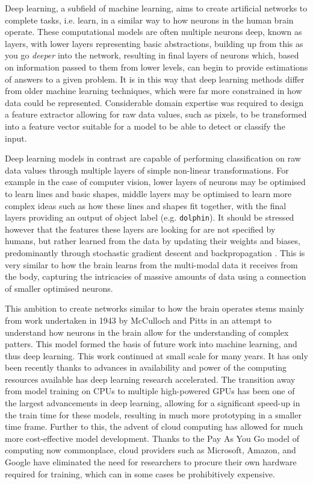 Deep learning, a subfield of machine learning, aims to create artificial networks to complete tasks, i.e. learn, in a similar way to how neurons in the human brain operate. These computational models are often multiple neurons deep, known as layers, with lower layers representing basic abstractions, building up from this as you go \textit{deeper} into the network, resulting in final layers of neurons which, based on information passed to them from lower levels, can begin to provide estimations of answers to a given problem. It is in this way that deep learning methods differ from older machine learning techniques, which were far more constrained in how data could be represented. Considerable domain expertise was required to design a feature extractor allowing for raw data values, such as pixels, to be transformed into a feature vector suitable for a model to be able to detect or classify the input. 

Deep learning models in contrast are capable of performing classification on raw data values through multiple layers of simple non-linear transformations. For example in the case of computer vision, lower layers of neurons may be optimised to learn lines and basic shapes, middle layers may be optimised to learn more complex ideas such as how these lines and shapes fit together, with the final layers providing an output of object label (e.g. \texttt{dolphin}). It should be stressed however that the features these layers are looking for are not specified by humans, but rather learned from the data by updating their weights and biases, predominantly through stochastic gradient descent and backpropagation  \cite{hecht-nielsen_iii.3_1992}. This is very similar to how the brain learns from the multi-modal data it receives from the body, capturing the intricacies of massive amounts of data using a connection of smaller optimised neurons. 

This ambition to create networks similar to how the brain operates stems mainly from work undertaken in 1943 by McCulloch and Pitts \cite{mcculloch_logical_1943} in an attempt to understand how neurons in the brain allow for the understanding of complex patters. This model formed the basis of future work into machine learning, and thus deep learning. This work continued at small scale for many years. It has only been recently thanks to advances in availability and power of the computing resources available has deep learning research accelerated. The transition away from model training on CPUs to multiple high-powered GPUs has been one of the largest advancements in deep learning, allowing for a significant speed-up in the train time for these models, resulting in much more prototyping in a smaller time frame. Further to this, the advent of cloud computing has allowed for much more cost-effective model development. Thanks to the Pay As You Go model of computing now commonplace, cloud providers such as Microsoft, Amazon, and Google have eliminated the need for researchers to procure their own hardware required for training, which can in some cases be prohibitively expensive. 

